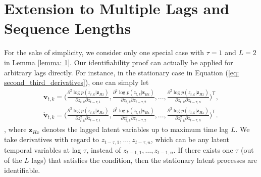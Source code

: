 \section{Extension to Multiple Lags and Sequence Lengths}
\label{app: Extension to Multiple Lags and Sequence Lengths}
 For the sake of simplicity, we consider only one special case with $\tau=1$ and $L=2$ in Lemma \ref{lemma: 1}. Our identifiability proof can actually be applied for arbitrary lags directly. For instance, in the stationary case in Equation (\ref{eq: second_third_derivatives}), one can simply let
 \begin{equation}
\label{eq: any_tau_derivatives}
 \begin{split}
    \mathbf{v}_{t,k} =
    \Big(\frac{\partial^{2}\log p(z_{t,k}|\mathbf{z}_{Hx}) }{\partial z_{t,k}\partial z_{t-\tau,1}},\frac{\partial^{2}\log p(z_{t,k}|\mathbf{z}_{Hx})}{\partial z_{t,k}\partial z_{t-\tau,2}},...,
        \frac{\partial^{2}\log p(z_{t,k}|\mathbf{z}_{Hx})}{\partial z_{t,k}\partial z_{t-\tau,n}}\Big)^{\mathsf{T}},\\
    \mathring{\mathbf{v}}_{t,k}=
\Big(\frac{\partial^{3}\log p(z_{t,k}|\mathbf{z}_{Hx})}{\partial z_{t,k}^{2}\partial z_{t-\tau,1}},\frac{\partial^{3}\log p(z_{t,k}|\mathbf{z}_{Hx})}{\partial z_{t,k}^{2}\partial z_{t-\tau,2}},...,
    \frac{\partial^{3}\log p(z_{t,k}|\mathbf{z}_{Hx})}{\partial z_{t,k}^{2}\partial z_{t-\tau,n}}\Big)^{\mathsf{T}}.
    \end{split}
\end{equation}
, where  $\mathbf{z}_{Hx}$ denotes the lagged latent variables up to maximum time lag $L$. We take derivatives with regard to $z_{ t-\tau,1}, …, z_{ t-\tau,n}$, which can be any latent temporal variables at lag $\tau$, instead of $z_{ t-1,1}, …, z_{t-1,n}$. If there exists one $\tau$ (out of the $L$ lags) that satisfies the condition, then the stationary latent processes are identifiable. 

